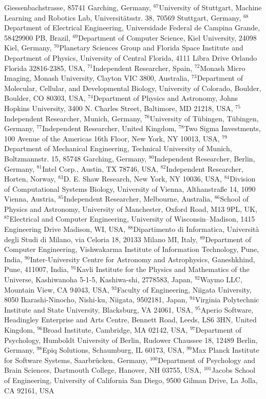 Giessenbachstrasse, 85741 Garching, Germany, $^{67}$University of Stuttgart, Machine Learning and Robotics Lab, Universitätsstr. 38, 70569 Stuttgart, Germany, $^{68}$Department of Electrical Engineering, Universidade Federal de Campina Grande, 58429900 PB, Brazil, $^{69}$Department of Computer Science, Kiel University, 24098 Kiel, Germany, $^{70}$Planetary Sciences Group and Florida Space Institute and Department of Physics, University of Central Florida, 4111 Libra Drive Orlando Florida 32816-2385, USA, $^{71}$Independent Researcher, Spain, $^{72}$Monash Micro Imaging, Monash University, Clayton VIC 3800, Australia, $^{73}$Department of Molecular, Cellular, and Developmental Biology, University of Colorado, Boulder, Boulder, CO 80303, USA, $^{74}$Department of Physics and Astronomy, Johns Hopkins University, 3400 N. Charles Street, Baltimore, MD 21218, USA, $^{75}$Independent Researcher, Munich, Germany, $^{76}$University of T\"ubingen, T\"ubingen, Germany, $^{77}$Independent Researcher, United Kingdom, $^{78}$Two Sigma Investments, 100 Avenue of the Americas 16th Floor, New York, NY 10013, USA, $^{79}$Department of Mechanical Engineering, Technical University of Munich, Boltzmannstr. 15, 85748 Garching, Germany, $^{80}$Independent Researcher, Berlin, Germany, $^{81}$Intel Corp., Austin, TX 78746, USA, $^{82}$Independent Researcher, Horten, Norway, $^{83}$D. E. Shaw Research, New York, NY 10036, USA, $^{84}$Division of Computational Systems Biology, University of Vienna, Althanstra{\ss}e 14, 1090 Vienna, Austria, $^{85}$Independent Researcher, Melbourne, Australia, $^{86}$School of Physics and Astronomy, University of Manchester, Oxford Road, M13 9PL, UK, $^{87}$Electrical and Computer Engineering, University of Wisconsin--Madison, 1415 Engineering Drive Madison, WI, USA, $^{88}$Dipartimento di Informatica, Universit\`a degli Studi di Milano, via Celoria 18, 20133 Milano MI, Italy, $^{89}$Department of Computer Engineering, Vishwakarma Institute of Information Technology, Pune, India, $^{90}$Inter-University Centre for Astronomy and Astrophysics, Ganeshkhind, Pune, 411007, India, $^{91}$Kavli Institute for the Physics and Mathematics of the Universe, Kashiwanoha 5-1-5, Kashiwa-shi, 2778583, Japan, $^{92}$Waymo LLC, Mountain View, CA 94043, USA, $^{93}$Faculty of Engineering, Niigata University, 8050 Ikarashi-Ninocho, Nishi-ku, Niigata, 9502181, Japan, $^{94}$Virginia Polytechnic Institute and State University, Blacksburg, VA 24061, USA, $^{95}$Aperio Software, Headingley Enterprise and Arts Centre, Bennett Road, Leeds, LS6 3HN, United Kingdom, $^{96}$Broad Institute, Cambridge, MA 02142, USA, $^{97}$Department of Psychology, Humboldt University of Berlin, Rudower Chaussee 18, 12489 Berlin, Germany, $^{98}$Epiq Solutions, Schaumburg, IL 60173, USA, $^{99}$Max Planck Institute for Software Systems, Saarbr\"ucken, Germany, $^{100}$Department of Psychology and Brain Sciences, Dartmouth College, Hanover, NH 03755, USA, $^{101}$Jacobs School of Engineering, University of California San Diego, 9500 Gilman Drive, La Jolla, CA 92161, USA